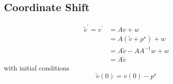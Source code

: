 \documentclass[12pt]{article}
\begin{document}
\subsection{Coordinate Shift}
    \begin{align*}
      \tilde{v}^{\prime}=v^\prime
			&= Av+w\\
			&= A(\tilde{v}+p^\star)+w\\
			&= A\tilde{v}-AA^{-1}w+w\\
			&= A\tilde{v}
    \end{align*}
    with initial conditions
    \[
      \tilde{v}(0)= v(0)-p^\star
    \]
\end{document}
